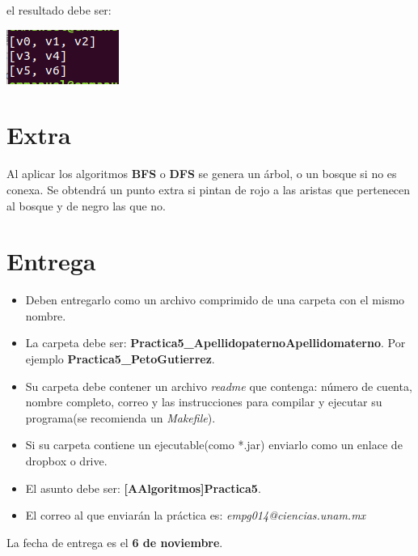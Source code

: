 \documentclass{article}
\begin{document}
el resultado debe ser:

\includegraphics[scale=1]{3component_terminal}

\section{Extra}

Al aplicar los algoritmos {\bf BFS} o {\bf DFS} se genera un árbol, o un bosque si no es conexa. Se obtendrá un punto extra si pintan de rojo a las aristas que pertenecen al bosque y de negro las que no.

\section{Entrega}

\begin{itemize}
\item Deben entregarlo como un archivo comprimido de una carpeta con el mismo nombre.
\item La carpeta debe ser: \textbf{Practica5\_ApellidopaternoApellidomaterno}. Por ejemplo \textbf{Practica5\_PetoGutierrez}.
\item Su carpeta debe contener un archivo \emph{readme} que contenga: número de cuenta, nombre completo, 
correo y las instrucciones para compilar y ejecutar su programa(se recomienda un \emph{Makefile}).
\item Si su carpeta contiene un ejecutable(como *.jar) enviarlo como un enlace de dropbox o drive.
\item El asunto debe ser: \textbf{[AAlgoritmos]Practica5}.
\item El correo al que enviarán la práctica es: \emph{empg014@ciencias.unam.mx}
\end{itemize}

La fecha de entrega es el \textbf{6 de noviembre}.
\end{document}
